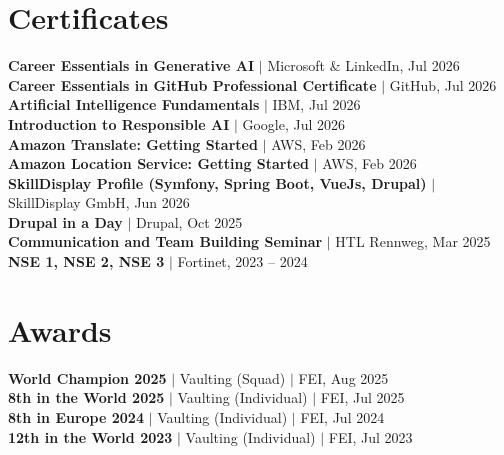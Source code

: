 \documentclass[letterpaper,11pt]{article}
\begin{document}
\section{Certificates}
 \begin{itemize}[leftmargin=0.15in, label={}]
    \small{\item{
     \textbf{Career Essentials in Generative AI} $|$ Microsoft \& LinkedIn, Jul 2026 \\
     \textbf{Career Essentials in GitHub Professional Certificate} $|$ GitHub, Jul 2026 \\
     \textbf{Artificial Intelligence Fundamentals} $|$ IBM, Jul 2026 \\
     \textbf{Introduction to Responsible AI} $|$ Google, Jul 2026 \\
     \textbf{Amazon Translate: Getting Started} $|$ AWS, Feb 2026 \\
     \textbf{Amazon Location Service: Getting Started} $|$ AWS, Feb 2026 \\
     \textbf{SkillDisplay Profile (Symfony, Spring Boot, VueJs, Drupal)} $|$ SkillDisplay GmbH, Jun 2026 \\
     \textbf{Drupal in a Day} $|$ Drupal, Oct 2025 \\
     \textbf{Communication and Team Building Seminar} $|$ HTL Rennweg, Mar 2025 \\
     \textbf{NSE 1, NSE 2, NSE 3} $|$ Fortinet, 2023 -- 2024
    }}
 \end{itemize}


\section{Awards}
 \begin{itemize}[leftmargin=0.15in, label={}]
    \small{\item{
     \textbf{World Champion 2025} $|$ Vaulting (Squad) $|$ FEI, Aug 2025 \\
     \textbf{8th in the World 2025} $|$ Vaulting (Individual) $|$ FEI, Jul 2025 \\
     \textbf{8th in Europe 2024} $|$ Vaulting (Individual) $|$ FEI, Jul 2024 \\
     \textbf{12th in the World 2023} $|$ Vaulting (Individual) $|$ FEI, Jul 2023
    }}
 \end{itemize}


\end{document}
